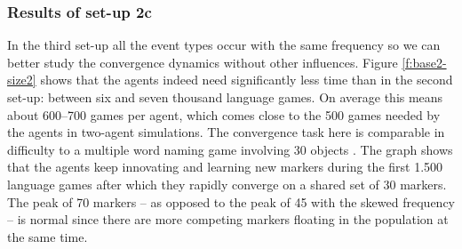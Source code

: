 \subsubsection{Results of set-up 2c}
 In the third set-up all the event types occur with the same frequency so we can better study the convergence dynamics without other influences. Figure \ref{f:base2-size2} shows that the agents indeed need significantly less time than in the second set-up: between six and seven thousand language games. On average this means about 600--700 games per agent, which comes close to the 500 games needed by the agents in two-agent simulations. The convergence task here is comparable in difficulty to a multiple word naming game involving 30 objects \citep[see][]{vanlooveren05design}. The graph shows that the agents keep innovating and learning new markers during the first 1.500 language games after which they rapidly converge on a shared set of 30 markers. The peak of 70 markers -- as opposed to the peak of 45 with the skewed frequency -- is normal since there are more competing markers floating in the population at the same time.

